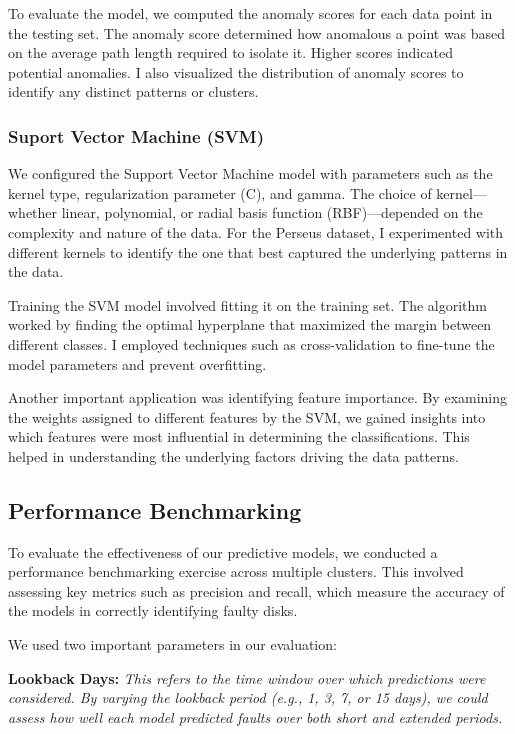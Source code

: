 \documentclass{article}
\begin{document}
\quad To evaluate the model, we computed the anomaly scores for each data point in the testing set. The anomaly score determined how anomalous a point was based on the average path length required to isolate it. Higher scores indicated potential anomalies. I also visualized the distribution of anomaly scores to identify any distinct patterns or clusters.

\subsubsection{Suport Vector Machine (SVM)}

\quad We configured the Support Vector Machine model with parameters such as the kernel type, regularization parameter (C), and gamma. The choice of kernel—whether linear, polynomial, or radial basis function (RBF)—depended on the complexity and nature of the data. For the Perseus dataset, I experimented with different kernels to identify the one that best captured the underlying patterns in the data.

\quad Training the SVM model involved fitting it on the training set. The algorithm worked by finding the optimal hyperplane that maximized the margin between different classes. I employed techniques such as cross-validation to fine-tune the model parameters and prevent overfitting.

\quad Another important application was identifying feature importance. By examining the weights assigned to different features by the SVM, we gained insights into which features were most influential in determining the classifications. This helped in understanding the underlying factors driving the data patterns.

\subsection{Performance Benchmarking}

\quad To evaluate the effectiveness of our predictive models, we conducted a performance benchmarking exercise across multiple clusters. This involved assessing key metrics such as precision and recall, which measure the accuracy of the models in correctly identifying faulty disks.

\quad We used two important parameters in our evaluation:

\textbf{Lookback Days:} \textit{This refers to the time window over which predictions were considered. By varying the lookback period (e.g., 1, 3, 7, or 15 days), we could assess how well each model predicted faults over both short and extended periods.}
\end{document}
